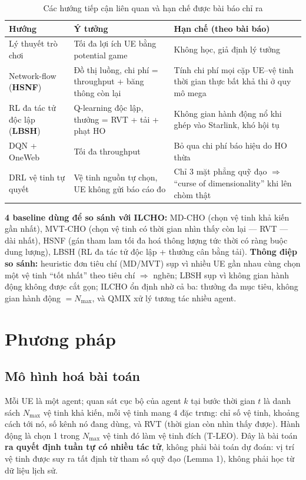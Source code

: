 \documentclass[12pt,a4paper]{article}
\begin{document}
\begin{table}[h]
\centering\small
\caption{Các hướng tiếp cận liên quan và hạn chế được bài báo chỉ ra}
\label{tab:related}
\begin{tabular}{@{}p{3.1cm}p{5cm}p{6cm}@{}}
\toprule
\textbf{Hướng} & \textbf{Ý tưởng} & \textbf{Hạn chế (theo bài báo)} \\
\midrule
Lý thuyết trò chơi & Tối đa lợi ích UE bằng potential game & Không học, giả định lý tưởng \\
Network-flow (\textbf{HSNF}) & Đồ thị luồng, chi phí = throughput + băng thông còn lại & Tính chi phí mọi cặp UE--vệ tinh thời gian thực bất khả thi ở quy mô mega \\
RL đa tác tử độc lập (\textbf{LBSH}) & Q-learning độc lập, thưởng = RVT + tải + phạt HO & Không gian hành động nổ khi ghép vào Starlink, khó hội tụ \\
DQN + OneWeb & Tối đa throughput & Bỏ qua chi phí báo hiệu do HO thừa \\
DRL vệ tinh tự quyết & Vệ tinh nguồn tự chọn, UE không gửi báo cáo đo & Chỉ 3 mặt phẳng quỹ đạo $\Rightarrow$ ``curse of dimensionality'' khi lên chòm thật \\
\bottomrule
\end{tabular}
\end{table}

\textbf{4 baseline dùng để so sánh với ILCHO:} MD-CHO (chọn vệ tinh khả kiến gần nhất),
MVT-CHO (chọn vệ tinh có thời gian nhìn thấy còn lại — RVT — dài nhất), HSNF (gán tham lam
tối đa hoá thông lượng tức thời có ràng buộc dung lượng), LBSH (RL đa tác tử độc lập + thưởng
cân bằng tải). \textbf{Thông điệp so sánh:} heuristic đơn tiêu chí (MD/MVT) sụp vì nhiều UE
gần nhau cùng chọn một vệ tinh ``tốt nhất'' theo tiêu chí $\Rightarrow$ nghẽn; LBSH sụp vì
không gian hành động không được cắt gọn; ILCHO ổn định nhờ cả ba: thưởng đa mục tiêu, không
gian hành động $=N_{\max}$, và QMIX xử lý tương tác nhiều agent.

\section{Phương pháp}

\subsection{Mô hình hoá bài toán}

Mỗi UE là một agent; quan sát cục bộ của agent $k$ tại bước thời gian $t$ là danh sách $N_{\max}$
vệ tinh khả kiến, mỗi vệ tinh mang 4 đặc trưng: chỉ số vệ tinh, khoảng cách tới nó, số kênh nó
đang dùng, và RVT (thời gian còn nhìn thấy được). Hành động là chọn 1 trong $N_{\max}$ vệ tinh
đó làm vệ tinh đích (T-LEO). Đây là bài toán \textbf{ra quyết định tuần tự có nhiều tác tử},
không phải bài toán dự đoán: vị trí vệ tinh được suy ra tất định từ tham số quỹ đạo (Lemma 1),
không phải học từ dữ liệu lịch sử.
\end{document}

